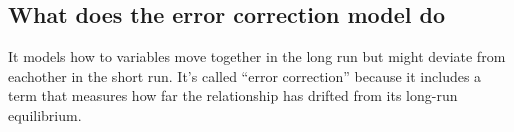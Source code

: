 \documentclass{article}
\begin{document}
\subsection{What does the error correction model do}
It models how to variables move together in the long run but might deviate from eachother in the short run. 
It’s called “error correction” because it includes a term that measures how far the relationship has drifted from its long-run equilibrium.
\end{document}

